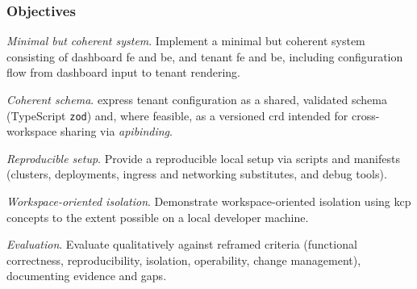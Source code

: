 \documentclass[11pt, a4paper, oneside, listof=totoc]{scrartcl}
\begin{document}
            \subsubsection{Objectives}\label{subsubsec:objectives}
                \begin{enumerate}[label={[\arabic*]:},
                        ref=Challenge~\arabic*,
                        leftmargin=*,
                        itemsep=0.6\baselineskip]

                        \item\label{chal:objectiveMinimal}
                            \textit{Minimal but coherent system}.
                            Implement a minimal but coherent system consisting of dashboard \gls{fe} and
                            \gls{be}, and tenant \gls{fe} and \gls{be}, including configuration flow
                            from dashboard input to tenant rendering.

                        \item\label{chal:objectiveSchema}
                            \textit{Coherent schema}.
                            \gls{express} tenant configuration as a shared, validated schema
                            (TypeScript \texttt{zod}) and, where feasible, as a versioned \gls{crd}
                            intended for cross-workspace sharing via \emph{\gls{apibinding}}.

                        \item\label{chal:objectiveReproducible}
                            \textit{Reproducible setup}.
                            Provide a reproducible local setup via scripts and manifests
                            (clusters, deployments, \gls{ingress} and networking substitutes, and debug
                            tools).

                        \item\label{chal:objectiveIsolation}
                            \textit{Workspace-oriented isolation}.
                            Demonstrate workspace-oriented isolation using \gls{kcp} concepts to the
                            extent possible on a local developer machine.

                        \item\label{chal:objectiveEval}
                            \textit{Evaluation}.
                            Evaluate qualitatively against reframed criteria (functional correctness,
                            reproducibility, isolation, operability, change management), documenting
                            evidence and gaps.
                \end{enumerate}
\end{document}
